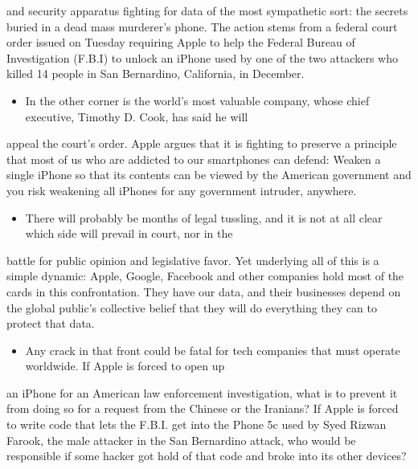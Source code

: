 \documentclass[UTF8,11pt]{ctexart}
\begin{document}
and security apparatus fighting for data of the most sympathetic sort: the secrets buried in a dead mass murderer’s phone. The action stems from a federal court order issued on Tuesday requiring Apple to help the Federal Bureau of Investigation (F.B.I) to unlock an iPhone used by one of the two attackers who killed 14 people in San Bernardino, California, in December.


\begin{itemize}[leftmargin=2em,itemsep=.2em,topsep=.4em]\item[D.] In the other corner is the world’s most valuable company, whose chief executive, Timothy D. Cook, has said he will
\end{itemize}

appeal the court’s order. Apple argues that it is fighting to preserve a principle that most of us who are addicted to our smartphones can defend: Weaken a single iPhone so that its contents can be viewed by the American government and you risk weakening all iPhones for any government intruder, anywhere.


\begin{itemize}[leftmargin=2em,itemsep=.2em,topsep=.4em]\item[E.] There will probably be months of legal tussling, and it is not at all clear which side will prevail in court, nor in the
\end{itemize}

battle for public opinion and legislative favor. Yet underlying all of this is a simple dynamic: Apple, Google, Facebook and other companies hold most of the cards in this confrontation. They have our data, and their businesses depend on the global public’s collective belief that they will do everything they can to protect that data.


\begin{itemize}[leftmargin=2em,itemsep=.2em,topsep=.4em]\item[F.] Any crack in that front could be fatal for tech companies that must operate worldwide. If Apple is forced to open up
\end{itemize}

an iPhone for an American law enforcement investigation, what is to prevent it from doing so for a request from the Chinese or the Iranians? If Apple is forced to write code that lets the F.B.I. get into the Phone 5c used by Syed Rizwan Farook, the male attacker in the San Bernardino attack, who would be responsible if some hacker got hold of that code and broke into its other devices?
\end{document}
